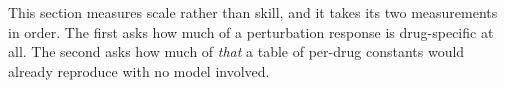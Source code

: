 \noindent
This section measures scale rather than skill, and it takes its two measurements in order. The
first asks how much of a perturbation response is drug-specific at all. The second
asks how much of \emph{that} a table of per-drug constants would already reproduce
with no model involved.

